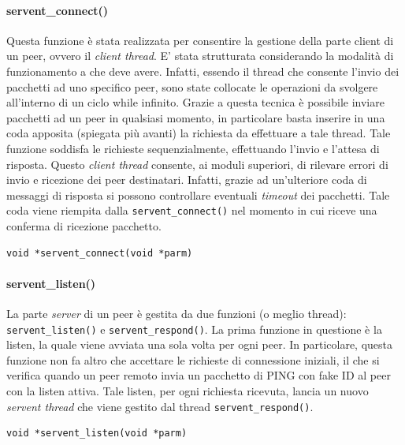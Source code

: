 \paragraph{servent\_connect()}
Questa funzione è stata realizzata per consentire la gestione della parte client di un peer, ovvero il \textit{client thread}. E' stata strutturata considerando la modalità di funzionamento a che deve avere. Infatti, essendo il thread che consente l'invio dei pacchetti ad uno specifico peer, sono state collocate le operazioni da svolgere all'interno di un ciclo while infinito. Grazie a questa tecnica è possibile inviare pacchetti ad un peer in qualsiasi momento, in particolare basta inserire in una coda apposita (spiegata più avanti) la richiesta da effettuare a tale thread. Tale funzione soddisfa le richieste sequenzialmente, effettuando l'invio e l'attesa di risposta.
Questo \textit{client thread} consente, ai moduli superiori, di rilevare errori di invio e ricezione dei peer destinatari. Infatti, grazie ad un'ulteriore coda di messaggi di risposta si possono controllare eventuali \textit{timeout} dei pacchetti. Tale coda viene riempita dalla \texttt{servent\_connect()} nel momento in cui riceve una conferma di ricezione pacchetto.
\begin{lstlisting}
void *servent_connect(void *parm)
\end{lstlisting}

\paragraph{servent\_listen()}
La parte \textit{server} di un peer è gestita da due funzioni (o meglio thread): \texttt{servent\_listen()} e \texttt{servent\_respond()}. La prima funzione in questione è la listen, la quale viene avviata una sola volta per ogni peer. In particolare, questa funzione non fa altro che accettare le richieste di connessione iniziali, il che si verifica quando un peer remoto invia un pacchetto di PING con fake ID al peer con la listen attiva. Tale listen, per ogni richiesta ricevuta, lancia un nuovo \textit{servent thread} che viene gestito dal thread \texttt{servent\_respond()}.
\begin{lstlisting}
void *servent_listen(void *parm)
\end{lstlisting}
